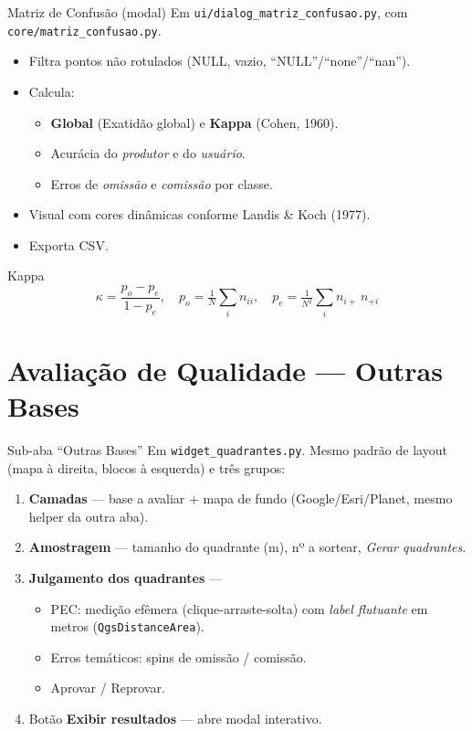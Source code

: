 \documentclass[10pt,aspectratio=169]{beamer}
\begin{document}
\begin{frame}{Matriz de Confusão (modal)}
  Em \texttt{ui/dialog\_matriz\_confusao.py}, com \texttt{core/matriz\_confusao.py}.
  \begin{itemize}
    \item Filtra pontos não rotulados (NULL, vazio, ``NULL''/``none''/``nan'').
    \item Calcula:
      \begin{itemize}
        \item \textbf{Global} (Exatidão global) e \textbf{Kappa} (Cohen, 1960).
        \item Acurácia do \emph{produtor} e do \emph{usuário}.
        \item Erros de \emph{omissão} e \emph{comissão} por classe.
      \end{itemize}
    \item Visual com cores dinâmicas conforme Landis \& Koch (1977).
    \item Exporta CSV.
  \end{itemize}
  \begin{block}{Kappa}
    \[
      \kappa = \frac{p_o - p_e}{1 - p_e}, \quad
      p_o = \tfrac{1}{N}\sum_i n_{ii}, \quad
      p_e = \tfrac{1}{N^2}\sum_i n_{i+}\, n_{+i}
    \]
  \end{block}
\end{frame}

\section{Avaliação de Qualidade — Outras Bases}
\begin{frame}{Sub-aba ``Outras Bases''}
  Em \texttt{widget\_quadrantes.py}. Mesmo padrão de layout (mapa à direita, blocos à esquerda) e três grupos:
  \begin{enumerate}
    \item \textbf{Camadas} — base a avaliar + mapa de fundo (Google/Esri/Planet, mesmo helper da outra aba).
    \item \textbf{Amostragem} — tamanho do quadrante (m), nº a sortear, \emph{Gerar quadrantes}.
    \item \textbf{Julgamento dos quadrantes} —
      \begin{itemize}
        \item PEC: medição efêmera (clique-arraste-solta) com \emph{label flutuante} em metros (\texttt{QgsDistanceArea}).
        \item Erros temáticos: spins de omissão / comissão.
        \item Aprovar / Reprovar.
      \end{itemize}
    \item Botão \textbf{Exibir resultados} — abre modal interativo.
  \end{enumerate}
\end{frame}
\end{document}

